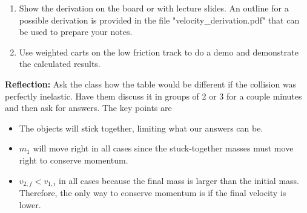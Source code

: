 \documentclass{article}
\begin{document}
\begin{enumerate}
\item Show the derivation on the board or with lecture slides. An outline for a possible derivation is provided in the file "velocity\_derivation.pdf" that can be used to prepare your notes.

\item Use weighted carts on the low friction track to do a demo and demonstrate the calculated results.
\end{enumerate}

\textbf{Reflection:} Ask the class how the table would be different if the collision was perfectly inelastic. Have them discuss it in groups of 2 or 3 for a couple minutes and then ask for answers. The key points are

\begin{itemize}
	\item The objects will stick together, limiting what our answers can be.
	\item $m_1$ will move right in all cases since the stuck-together masses must move right to conserve momentum.
	\item $v_{2,f} < v_{1,i}$ in all cases because the final mass is larger than the initial mass. Therefore, the only way to conserve momentum is if the final velocity is lower.
\end{itemize}

\hspace{14pt}
\end{document}
